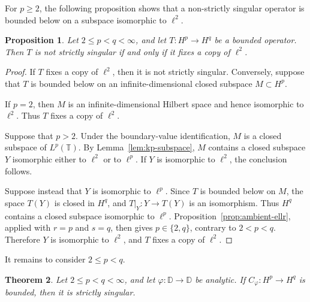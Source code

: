 \documentclass[10pt,a4paper]{amsart}
\newtheorem{theorem}{Theorem}[section]
\newtheorem{proposition}[theorem]{Proposition}
\newcommand{\D}{\mathbb{D}}
\newcommand{\T}{\mathbb{T}}
\begin{document}
For \(p\ge2\), the following proposition shows that a non-strictly
singular operator is bounded below on a subspace isomorphic to
\(\ell^2\).

\begin{proposition}
\label{prop:ss-criterion}
Let \(2\le p<q<\infty\), and let
\(T:H^p\to H^q\) be a bounded operator. Then \(T\) is not strictly
singular if and only if it fixes a copy of \(\ell^2\).
\end{proposition}

\begin{proof}
If \(T\) fixes a copy of \(\ell^2\), then it is not strictly singular.
Conversely, suppose that \(T\) is bounded below on an
infinite-dimensional closed subspace \(M\subset H^p\).

If \(p=2\), then \(M\) is an infinite-dimensional Hilbert space and
hence isomorphic to \(\ell^2\). Thus \(T\) fixes a copy of \(\ell^2\).

Suppose that \(p>2\). Under the boundary-value identification,
\(M\) is a closed subspace of \(L^p(\T)\). By
Lemma~\ref{lem:kp-subspace}, \(M\) contains a closed
subspace \(Y\) isomorphic either to \(\ell^2\) or to \(\ell^p\). If
\(Y\) is isomorphic to \(\ell^2\), the conclusion follows.

Suppose instead that \(Y\) is isomorphic to \(\ell^p\). Since \(T\)
is bounded below on \(M\), the space \(T(Y)\) is closed in \(H^q\), and
\(T|_Y\colon Y\to T(Y)\) is an isomorphism.
Thus \(H^q\) contains a closed subspace isomorphic
to \(\ell^p\). Proposition~\ref{prop:ambient-ellr}, applied with
\(r=p\) and \(s=q\), then gives \(p\in\{2,q\}\), contrary to
\(2<p<q\). Therefore \(Y\) is isomorphic to \(\ell^2\), and \(T\)
fixes a copy of \(\ell^2\).
\end{proof}

It remains to consider \(2\le p<q\).

\begin{theorem}
\label{thm:ss-above2}
Let \(2\le p<q<\infty\), and let \(\varphi:\D\to\D\) be analytic.
If \(C_\varphi:H^p\to H^q\) is bounded, then it is strictly singular.
\end{theorem}
\end{document}
